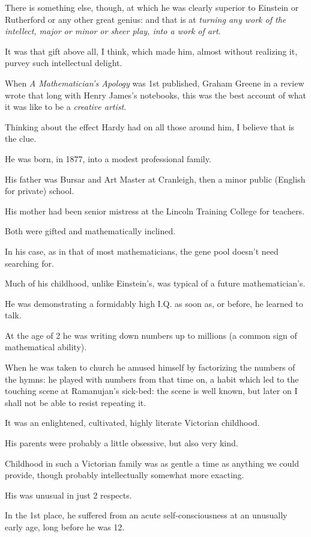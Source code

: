 \documentclass{article}
\numberwithin{equation}{section}
\begin{document}
There is something else, though, at which he was clearly superior to Einstein or Rutherford or any other great genius: and that is at \textit{turning any work of the intellect, major or minor or sheer play, into a work of art}.

It was that gift above all, I think, which made him, almost without realizing it, purvey such intellectual delight.

When \textit{A Mathematician's Apology} was 1st published, Graham Greene in a review wrote that long with Henry James's notebooks, this was the best account of what it was like to be a \textit{creative artist}.

Thinking about the effect Hardy had on all those around him, I believe that is the clue.

%
He was born, in 1877, into a modest professional family.

His father was Bursar and Art Master at Cranleigh, then a minor public (English for private) school.

His mother had been senior mistress at the Lincoln Training College for teachers.

Both were gifted and mathematically inclined.

In his case, as in that of most mathematicians, the gene pool doesn't need searching for.

Much of his childhood, unlike Einstein's, was typical of a future mathematician's.

He was demonstrating a formidably high I.Q. as soon as, or before, he learned to talk.

At the age of 2 he was writing down numbers up to millions (a common sign of mathematical ability).

When he was taken to church he amused himself by factorizing the numbers of the hymns: he played with numbers from that time on, a habit which led to the touching scene at Ramanujan's sick-bed: the scene is well known, but later on I shall not be able to resist repeating it.

%
It was an enlightened, cultivated, highly literate Victorian childhood.

His parents were probably a little obsessive, but also very kind.

Childhood in such a Victorian family was as gentle a time as anything we could provide, though probably intellectually somewhat more exacting.

His was unusual in just 2 respects.

In the 1st place, he suffered from an acute self-consciousness at an unusually early age, long before he was 12.
\end{document}
